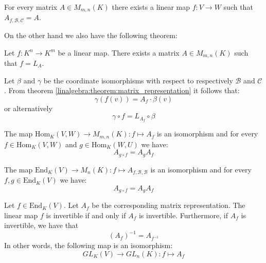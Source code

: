         \begin{theorem}\label{linalgebra:theorem:map_matrix_link}
		For every matrix $A\in M_{m,n}(K)$ there exists a linear map $f:V\rightarrow W$ such that $A_{f, \mathcal{B}, \mathcal{C}} = A$.
	\end{theorem}
        On the other hand we also have the following theorem:
        \begin{theorem}
		Let $f:K^n\rightarrow K^m$ be a linear map. There exists a matrix $A\in M_{m,n}(K)$ such that $f=L_A$.
	\end{theorem}
        \begin{theorem}
		Let $\beta$ and $\gamma$ be the coordinate isomorphisms with respect to respectively $\mathcal{B}$ and $\mathcal{C}$. From theorem \ref{linalgebra:theorem:matrix_representation} it follows that:
        	\begin{equation}
			\gamma(f(v)) = A_f\cdot\beta(v)
		\end{equation}
        	or alternatively
        	\begin{equation}
			\gamma\circ f = L_{A_f}\circ\beta
		\end{equation}
	\end{theorem}
        
        \begin{theorem}\label{linalgebra:theorem:matrix_composition_hom}
	        The map $\text{Hom}_K(V,W)\rightarrow M_{m,n}(K):f\mapsto A_f$ is an isomorphism and for every $f\in\text{Hom}_K(V,W)$ and $g\in \text{Hom}_K(W,U)$ we have:
		\begin{equation}
			A_{g\circ f} = A_gA_f
		\end{equation}
	\end{theorem}
	
	\begin{theorem}\label{linalgebra:theorem:matrix_composition_end}
	        The map $\text{End}_K(V)\rightarrow M_n(K):f\mapsto A_{f, \mathcal{B}, \mathcal{B}}$ is an isomorphism and for every $f,g\in\text{End}_K(V)$ we have:
        	\begin{equation}
			A_{g\circ f} = A_gA_f
		\end{equation}
	\end{theorem}
	
        \begin{theorem}\label{linalgebra:matrix_invertable_map}
	        Let $f\in\text{End}_K(V)$. Let $A_f$ be the corresponding matrix representation. The linear map $f$ is invertible if and only if $A_f$ is invertible. Furthermore, if $A_f$ is invertible, we have that \[\left(A_f\right)^{-1} = A_{f^{-1}}\] In other words, the following map is an isomorphism\footnotemark:
	        \begin{equation}
	        	GL_K(V)\rightarrow GL_n(K):f\mapsto A_f
	        \end{equation}
	\end{theorem}
        
